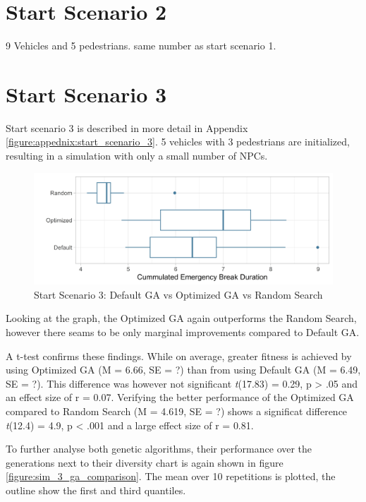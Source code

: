 \section{Start Scenario 2}
9 Vehicles and 5 pedestrians. same number as start scenario 1.


\section{Start Scenario 3}
\label{chap:evaluation:scenario_3}
Start scenario 3 is described in more detail in Appendix \ref{figure:appednix:start_scenario_3}. 5 vehicles with 3 pedestrians are initialized, resulting in a simulation with only a small number of NPCs.

\begin{figure}[ht] 
	\label{figure:sim_3_comparison}
	\includegraphics[width=1\linewidth]{simulations/evaluation/plots/sim_3_comparison}
	\caption{Start Scenario 3: Default GA vs Optimized GA vs Random Search}
\end{figure}

Looking at the graph, the Optimized GA again outperforms the Random Search, however there seams to be only marginal improvements compared to Default GA. 

A t-test confirms these findings. While on average, greater fitness is achieved by using Optimized GA (M = 6.66, SE = ?) than from using Default GA (M = 6.49, SE = ?). This difference was however not significant \textit{t}(17.83) = 0.29, p > .05 and an effect size of r = 0.07.
Verifying the better performance of the Optimized GA compared to Random Search (M = 4.619, SE = ?) shows a significat difference \textit{t}(12.4) = 4.9, p < .001 and a large effect size of r = 0.81.

To further analyse both genetic algorithms, their performance over the generations next to their diversity chart is again shown in figure \ref{figure:sim_3_ga_comparison}. The mean over 10 repetitions is plotted, the outline show the first and third quantiles.

